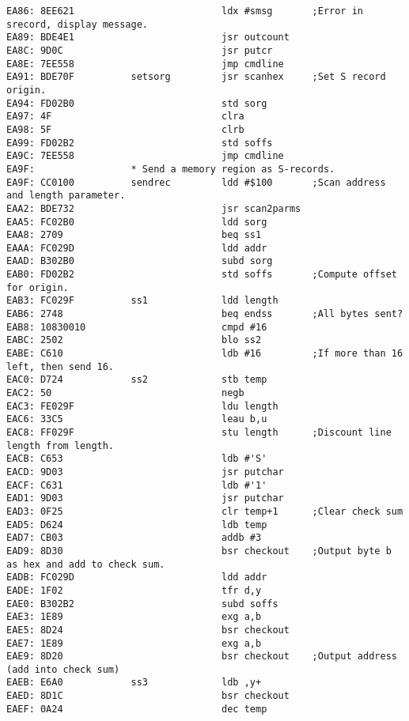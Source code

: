 {\begin{verbatim}
EA86: 8EE621                          ldx #smsg       ;Error in srecord, display message.
EA89: BDE4E1                          jsr outcount
EA8C: 9D0C                            jsr putcr
EA8E: 7EE558                          jmp cmdline
EA91: BDE70F          setsorg         jsr scanhex     ;Set S record origin.
EA94: FD02B0                          std sorg
EA97: 4F                              clra 
EA98: 5F                              clrb
EA99: FD02B2                          std soffs
EA9C: 7EE558                          jmp cmdline
EA9F:                 * Send a memory region as S-records.
EA9F: CC0100          sendrec         ldd #$100       ;Scan address and length parameter.
EAA2: BDE732                          jsr scan2parms                          
EAA5: FC02B0                          ldd sorg
EAA8: 2709                            beq ss1
EAAA: FC029D                          ldd addr
EAAD: B302B0                          subd sorg
EAB0: FD02B2                          std soffs       ;Compute offset for origin.
EAB3: FC029F          ss1             ldd length      
EAB6: 2748                            beq endss       ;All bytes sent?
EAB8: 10830010                        cmpd #16
EABC: 2502                            blo ss2         
EABE: C610                            ldb #16         ;If more than 16 left, then send 16.
EAC0: D724            ss2             stb temp
EAC2: 50                              negb
EAC3: FE029F                          ldu length
EAC6: 33C5                            leau b,u
EAC8: FF029F                          stu length      ;Discount line length from length.
EACB: C653                            ldb #'S'
EACD: 9D03                            jsr putchar
EACF: C631                            ldb #'1'
EAD1: 9D03                            jsr putchar
EAD3: 0F25                            clr temp+1      ;Clear check sum
EAD5: D624                            ldb temp
EAD7: CB03                            addb #3
EAD9: 8D30                            bsr checkout    ;Output byte b as hex and add to check sum.
EADB: FC029D                          ldd addr
EADE: 1F02                            tfr d,y
EAE0: B302B2                          subd soffs
EAE3: 1E89                            exg a,b
EAE5: 8D24                            bsr checkout
EAE7: 1E89                            exg a,b
EAE9: 8D20                            bsr checkout    ;Output address (add into check sum)
EAEB: E6A0            ss3             ldb ,y+
EAED: 8D1C                            bsr checkout
EAEF: 0A24                            dec temp

\end{verbatim}}
